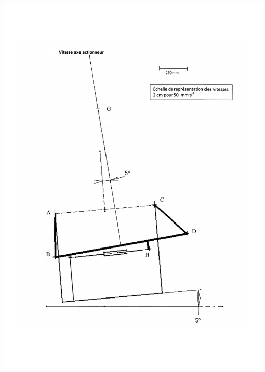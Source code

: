 \begin{center}
\includegraphics[width=0.9\linewidth]{img/Q4}
\end{center}

\newpage



\newpage




\newpage







\newpage



